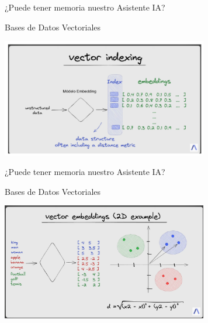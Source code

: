 \documentclass[table, unknownkeysallowed, 10pt]{beamer}
\begin{document}
\begin{frame}{¿Puede tener memoria nuestro Asistente IA?}
    \begin{block}{Bases de Datos Vectoriales}
    \begin{center}
        \includegraphics[width=9cm]{imagenes/vectorDB.png}
    \end{center}
\end{block}
\end{frame}

\begin{frame}{¿Puede tener memoria nuestro Asistente IA?}
    \begin{block}{Bases de Datos Vectoriales}
    \begin{center}
        \includegraphics[width=9cm]{imagenes/vectorDB_graph.png}
    \end{center}
\end{block}
\end{frame}
\end{document}
